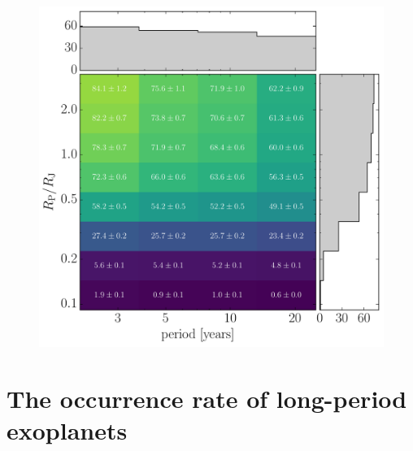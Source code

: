 \documentclass[manuscript, letterpaper]{aastex6}
\newcommand{\figlabel}[1]{\label{fig:#1}}
\begin{document}
\begin{figure}
\vspace{\baselineskip}
\begin{center}
\includegraphics[width=\textwidth]{figures/completeness.pdf}
\end{center}
\caption{%
\figlabel{completeness}}
\end{figure}


\section{The occurrence rate of long-period exoplanets}
\end{document}
